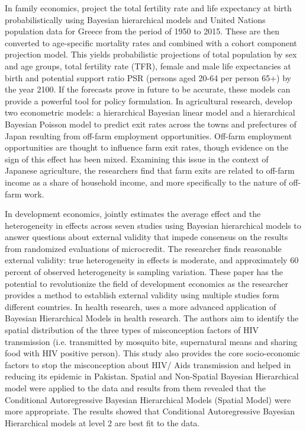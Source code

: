 In family economics, \cite{lamnisos2019demographic} project the total fertility rate and life expectancy at birth probabilistically using Bayesian hierarchical models and United Nations population data for Greece from the period of 1950 to 2015. These are then converted to age-specific mortality rates and combined with a cohort component projection model. This yields probabilistic projections of total population by sex and age groups, total fertility rate (TFR), female and male life expectancies at birth and potential support ratio PSR (persons aged 20-64 per person 65+) by the year 2100. If the forecasts prove in future to be accurate, these models can provide a powerful tool for policy formulation. In agricultural research, \cite{ ramsey2019saying} develop two econometric models: a hierarchical Bayesian linear model and a hierarchical Bayesian Poisson model to predict exit rates across the towns and prefectures of Japan resulting from off-farm employment opportunities. Off-farm employment opportunities are thought to influence farm exit rates, though evidence on the sign of this effect has been mixed. Examining this issue in the context of Japanese agriculture, the researchers find that farm exits are related to off-farm income as a share of household income, and more specifically to the nature of off-farm work.

In development economics, \cite{ meager2019understanding} jointly estimates the average effect and the heterogeneity in effects across seven studies using Bayesian hierarchical models to answer questions about external validity that impede consensus on the results from randomized evaluations of microcredit. The researcher finds reasonable external validity: true heterogeneity in effects is moderate, and approximately 60 percent of observed heterogeneity is sampling variation. These paper has the potential to revolutionize the field of development economics as the researcher provides a method to establish external validity using multiple studies form different countries. In health research, \cite{ rashid2019socio} uses a more advanced application of Bayesian Hierarchical Models in health research. The authors aim to identify the spatial distribution of the three types of misconception factors of HIV transmission (i.e. transmitted by mosquito bite, supernatural means and sharing food with HIV positive person). This study also provides the core socio-economic factors to stop the misconception about HIV/ Aids transmission and helped in reducing its epidemic in Pakistan. Spatial and Non-Spatial Bayesian Hierarchical model were applied to the data and results from them revealed that the Conditional Autoregressive Bayesian Hierarchical Models (Spatial Model) were more appropriate. The results showed that Conditional Autoregressive Bayesian Hierarchical models at level 2 are best fit to the data.

